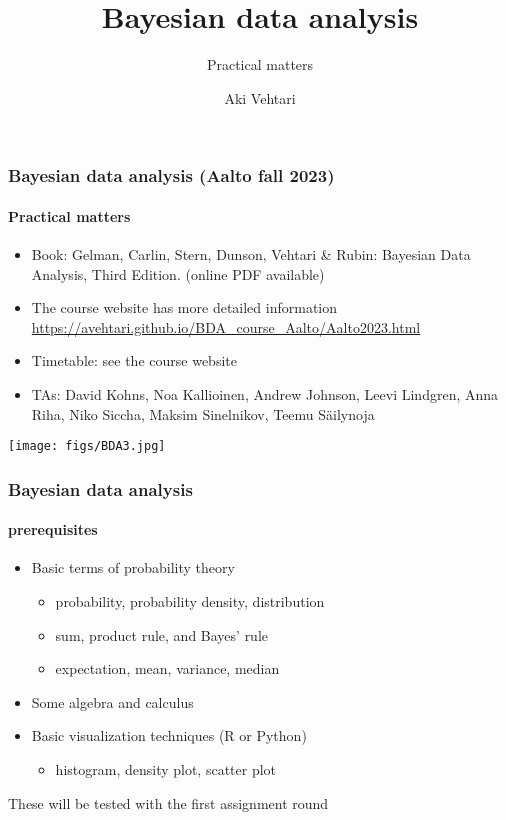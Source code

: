\documentclass[english,t]{beamer}
\title[]{Bayesian data analysis}
\subtitle{Practical matters}
\author{Aki Vehtari}
\institute[Aalto University]{}
\begin{document}
\begin{frame}
  \frametitle{Bayesian data analysis (Aalto fall 2023)}  %
  \framesubtitle{Practical matters}
  
  \begin{itemize}
  \item Book: Gelman, Carlin, Stern, Dunson, Vehtari \& Rubin: Bayesian Data
    Analysis, Third Edition. {\footnotesize (online PDF available)}
  \item The course website has more detailed information\\
    {\small\url{https://avehtari.github.io/BDA_course_Aalto/Aalto2023.html}}
  \item Timetable: see the course website
  \item TAs: David Kohns, Noa Kallioinen, Andrew Johnson, Leevi
    Lindgren, Anna Riha, Niko Siccha, Maksim Sinelnikov, Teemu
    Säilynoja
    \end{itemize}
    \vspace{-0.5\baselineskip}
 \begin{center}
   \texttt{[image: figs/BDA3.jpg]}
 \end{center}

\end{frame}

\begin{frame}
  \frametitle{Bayesian data analysis}  %
  \framesubtitle{prerequisites}
  \begin{itemize}
  \item Basic terms of probability theory
    \begin{itemize}
    \item probability, probability density, distribution
    \item sum, product rule, and Bayes' rule
    \item expectation, mean, variance, median
    \end{itemize}
  \item Some algebra and calculus
  \item Basic visualization techniques (R or Python)
    \begin{itemize}
    \item histogram, density plot, scatter plot
    \end{itemize}
  \end{itemize}

  These will be tested with the first assignment round

\end{frame}
\end{document}
